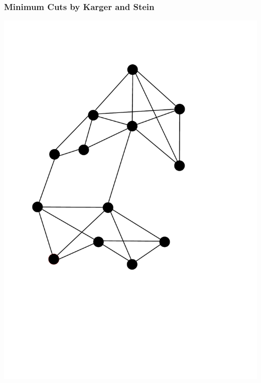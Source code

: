 \documentclass[titlepage,german,presentation]{beamer}
\begin{document}
\begin{frame}
\frametitle{Minimum Cuts by Karger and Stein}

\includegraphics[height=0.6\textheight]{min-cut-1.pdf}

\end{frame}
\end{document}
